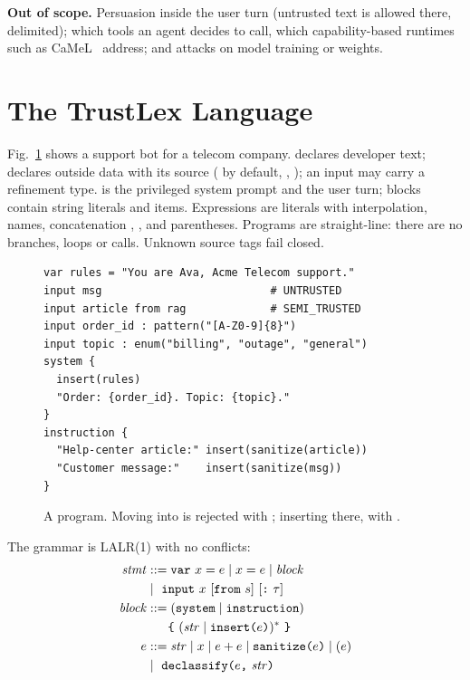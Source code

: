 \documentclass[journal]{IEEEtran}
\begin{document}
\textbf{Out of scope.} Persuasion inside the user turn (untrusted text is allowed there, delimited); which tools an agent decides to call, which capability-based runtimes such as CaMeL~\cite{debenedetti2025camel} address; and attacks on model training or weights.

\section{The TrustLex Language}\label{sec:lang}

Fig.~\ref{lst:example} shows a support bot for a telecom company.  declares developer text;  declares outside data with its source ( by default, , ); an input may carry a refinement type.  is the privileged system prompt and  the user turn; blocks contain string literals and  items. Expressions are literals with  interpolation, names, concatenation \code{+}, ,  and parentheses. Programs are straight-line: there are no branches, loops or calls. Unknown source tags fail closed.

\begin{figure}[t]
\begin{lstlisting}
var rules = "You are Ava, Acme Telecom support."
input msg                          # UNTRUSTED
input article from rag             # SEMI_TRUSTED
input order_id : pattern("[A-Z0-9]{8}")
input topic : enum("billing", "outage", "general")
system {
  insert(rules)
  "Order: {order_id}. Topic: {topic}."
}
instruction {
  "Help-center article:" insert(sanitize(article))
  "Customer message:"    insert(sanitize(msg))
}
\end{lstlisting}
\caption{A \TL{} program. Moving  into  is rejected with ; inserting  there, with .}
\label{lst:example}
\end{figure}

The grammar is LALR(1) with no conflicts:
{\small
\begin{align*}
\mathit{stmt} &::= \texttt{var}\ x = e \mid x = e \mid \mathit{block}\\
 &\mid\ \texttt{input}\ x\ [\texttt{from}\ s]\ [\texttt{:}\ \tau]\\
\mathit{block} &::= (\texttt{system} \mid \texttt{instruction})\\
 &\phantom{::=}\ \texttt{\{}\ (\mathit{str} \mid \texttt{insert(}e\texttt{)})^{*}\ \texttt{\}}\\
e &::= \mathit{str} \mid x \mid e + e \mid \texttt{sanitize(}e\texttt{)} \mid (e)\\
 &\mid\ \texttt{declassify(}e\texttt{,}\ \mathit{str}\texttt{)}
\end{align*}}
\end{document}
